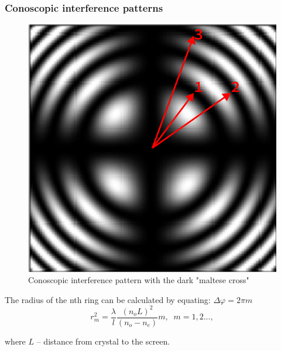 \documentclass{beamer}
\begin{document}
	\begin{frame}
		\frametitle{Conoscopic interference patterns}
		
		\begin{figure}
			\centering
			\includegraphics[width=0.5\linewidth]{res/pattern.png}
			\caption{Conoscopic interference pattern with the dark "maltese cross"}
		\end{figure}
		
		\footnotesize
		The radius of the nth ring can be calculated by equating: $\Delta \varphi = 2 \pi m$
		$$r^2_m = \frac{\lambda}{l} \frac{(n_o L)^2}{(n_o - n_e)} m,\;\; m = 1,2...,$$
		
		where $L$ -- distance from crystal to the screen.
	\end{frame}
		
\end{document}
